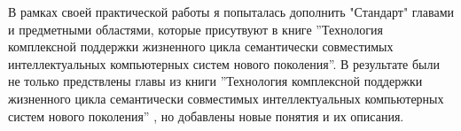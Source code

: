 
В рамках своей практической работы я попыталась дополнить "Стандарт"  главами и предметными областями, которые присутвуют в книге ''Технология комплексной поддержки жизненного цикла семантически совместимых интеллектуальных компьютерных систем нового поколения''. В результате были не только предствлены главы из книги ''Технология комплексной поддержки жизненного цикла семантически совместимых интеллектуальных компьютерных систем нового поколения'' , но добавлены новые понятия и их описания.